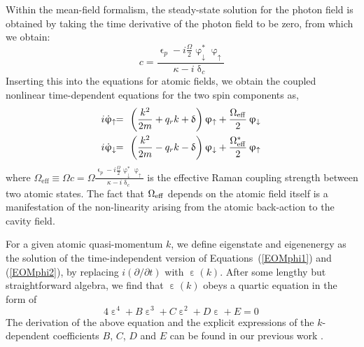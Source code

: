 \documentclass[atoms,article,accept,moreauthors,pdftex,12pt,a4paper]{mdpi}
\def\ba{\begin{eqnarray}}
\def\ea{\end{eqnarray}}
\begin{document}
Within the mean-field formalism, the steady-state solution for the photon field is obtained by taking the time derivative of the photon field to be zero, from which we obtain:
\begin{equation}
c = \frac{\upvarepsilon_{p}-i\frac{\Omega}{2} \upvarphi_\downarrow^\ast\upvarphi_\uparrow}{\kappa-i\updelta_{c}}
\label{c}
\end{equation}
Inserting this into the equations for atomic fields, we obtain the coupled nonlinear time-dependent equations for the two spin components as,
\ba
i\dot{\upvarphi}_{\uparrow}&\!\! =\!\! & \left(\frac{{k}^{2}}{2m}+q_{r}k+\updelta\right) \upvarphi_{\uparrow}+ \frac{\Omega_{\rm eff}}{2}\, \upvarphi_{\downarrow} \,
\label{EOMphi1}\\
i\dot{\upvarphi}_{\downarrow} & \!\!= \!\!& \left(\frac{{k}^{2}}{2m}-q_{r}k-\updelta\right)\upvarphi_{\downarrow}+ \frac{\Omega^*_{\rm eff}}{2}\,\upvarphi_{\uparrow}\,\label{EOMphi2}
\ea
where $\Omega_\text{eff} \equiv {\Omega} c ={\Omega} \frac{\upvarepsilon_{p}-i\frac{\Omega}{2} \upvarphi_\downarrow^\ast\upvarphi_\uparrow}{\kappa-i\updelta_{c}} $ is the effective Raman coupling strength between two atomic states. The fact that $\Omega_{\rm eff}$ depends on the atomic field itself is a manifestation of the non-linearity arising from the atomic back-action to the cavity field.

For a given atomic quasi-momentum ${k}$, we define eigenstate and eigenenergy as the solution of the time-independent version of Equations~(\ref{EOMphi1}) and (\ref{EOMphi2}), by replacing $i(\partial/\partial t)$ with $\upepsilon({k})$. After some lengthy but straightforward algebra, we find that $\upepsilon({ k})$ obeys a quartic equation in the form of
\begin{equation}
4\upepsilon^4+B\upepsilon^3+C\upepsilon^2+D\upepsilon+E=0 \,
\label{generalquarticEq}
\end{equation}
The derivation of the above equation and the explicit expressions of the $k$-dependent coefficients $B$, $C$, $D$ and $E$ can be found in our previous work \cite{cavitySOC}.
\end{document}
